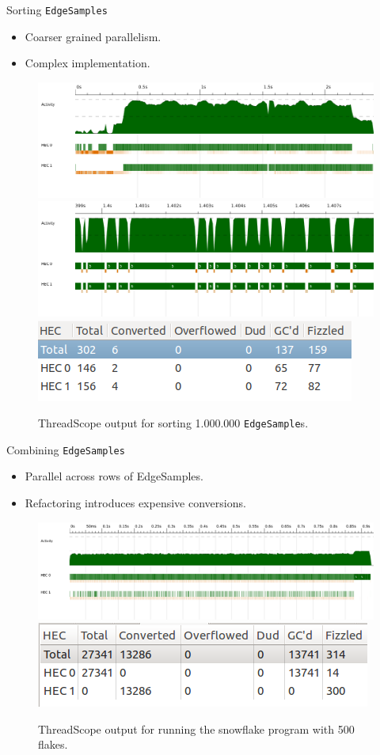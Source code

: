 \documentclass[slidestop,compress,mathserif, xcolor=table]{beamer}
\begin{document}
\begin{frame}[c]{Sorting \texttt{EdgeSamples}}
  \begin{itemize}
  \item Coarser grained parallelism.
  \item Complex implementation.
  \end{itemize}
 \begin{figure}[h!]
  \centering
  \includegraphics[width=0.7\linewidth,trim={0cm 2cm 0 0},clip]{../threadscope/sorting/sorting-final}\\
  \includegraphics[width=0.3\linewidth,trim={4cm 3cm 5cm 0},clip]{../threadscope/sorting/sorting-final-zoom}
  \includegraphics[width=0.4\linewidth,trim={0 0 0 1cm}]{../threadscope/sorting/sorting-final-sparks}
  \caption{ThreadScope output for sorting 1.000.000 \texttt{EdgeSample}s.}
  \label{fig:sorting-thread}
\end{figure}

\end{frame}

\begin{frame}[c]{Combining \texttt{EdgeSamples}}
  \begin{itemize}
  \item Parallel across rows of EdgeSamples.
  \item Refactoring introduces expensive conversions.
  \end{itemize}
 \begin{figure}[h!]
  \centering
  \includegraphics[width=0.7\linewidth,trim={0cm 2cm 0 0},clip]{../threadscope/combinegrouped/bigflake}\\
  \includegraphics[width=0.55\linewidth,trim={0 0 0 0},clip]{../threadscope/combinegrouped/sparks}
  \caption{ThreadScope output for running the snowflake program with 500 flakes.}
\end{figure}
\end{frame}
\end{document}
